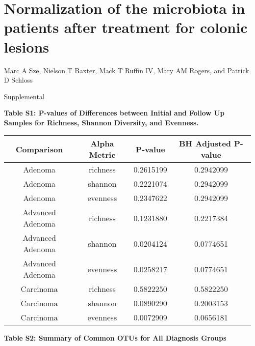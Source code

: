 \documentclass[12pt,]{article}
\title{}
\author{}
\date{}
\begin{document}
\section{Normalization of the microbiota in patients after treatment for
colonic
lesions}\label{normalization-of-the-microbiota-in-patients-after-treatment-for-colonic-lesions}

\vspace{10mm}

\begin{center}
Marc A Sze, Nielson T Baxter, Mack T Ruffin IV, Mary AM Rogers, and Patrick D Schloss

\vspace{10mm}

Supplemental
\end{center}

\newpage

\textbf{Table S1: P-values of Differences between Initial and Follow Up
Samples for Richness, Shannon Diversity, and Evenness.}

\begin{longtable}[]{@{}cccc@{}}
\toprule
Comparison & Alpha Metric & P-value & BH Adjusted P-value\tabularnewline
\midrule
\endhead
Adenoma & richness & 0.2615199 & 0.2942099\tabularnewline
Adenoma & shannon & 0.2221074 & 0.2942099\tabularnewline
Adenoma & evenness & 0.2347622 & 0.2942099\tabularnewline
Advanced Adenoma & richness & 0.1231880 & 0.2217384\tabularnewline
Advanced Adenoma & shannon & 0.0204124 & 0.0774651\tabularnewline
Advanced Adenoma & evenness & 0.0258217 & 0.0774651\tabularnewline
Carcinoma & richness & 0.5822250 & 0.5822250\tabularnewline
Carcinoma & shannon & 0.0890290 & 0.2003153\tabularnewline
Carcinoma & evenness & 0.0072909 & 0.0656181\tabularnewline
\bottomrule
\end{longtable}

\newpage

\newcommand{\blandscape}{\begin{landscape}}
\newcommand{\elandscape}{\end{landscape}}

\textbf{Table S2: Summary of Common OTUs for All Diagnosis Groups}

\footnotesize
\end{document}
